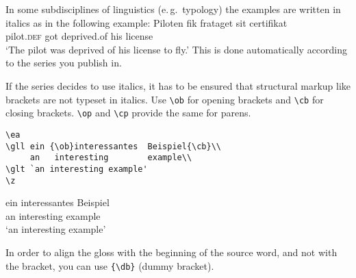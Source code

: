 % 


In some subdisciplines of linguistics (e.\,g.\ typology) the examples are written in italics as in the
following example:
\ea
\def\exfont{\normalsize\itshape}
\gll Piloten         fik frataget    sit certifikat{\footnotemark}\\
     pilot.{\scshape def} got deprived.of his license\\
\glt `The pilot was deprived of his license to fly.'
\z 
This is done automatically according to the series you publish in. 

If the series decides to use italics, it has to be ensured that structural markup like brackets are not typeset in italics. Use \verb+\ob+ for opening brackets and \verb+\cb+ for closing brackets. \verb+\op+ and \verb+\cp+ provide the same for parens.
\begin{verbatim}
\ea
\gll ein {\ob}interessantes  Beispiel{\cb}\\
     an   interesting        example\\
\glt `an interesting example'
\z 
\end{verbatim}
\ea
\def\exfont{\normalsize\itshape}
\gll ein {\ob}interessantes       Beispiel{\cb}\\
     an   interesting example\\
\glt `an interesting example'
\z 
{}

In order to align the gloss with the beginning of the source word, and not with the bracket, you can use \verb+{\db}+ (dummy bracket).


